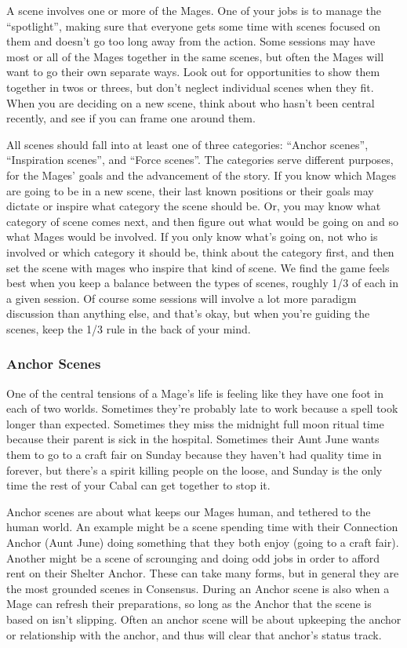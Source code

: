 \documentclass[
  oneside,
  statementpaper,
  9pt]{memoir}
\begin{document}
A scene involves one or more of the Mages. One of your jobs is to manage
the ``spotlight'', making sure that everyone gets some time with scenes
focused on them and doesn't go too long away from the action. Some
sessions may have most or all of the Mages together in the same scenes,
but often the Mages will want to go their own separate ways. Look out
for opportunities to show them together in twos or threes, but don't
neglect individual scenes when they fit. When you are deciding on a new
scene, think about who hasn't been central recently, and see if you can
frame one around them.

All scenes should fall into at least one of three categories: ``Anchor
scenes'', ``Inspiration scenes'', and ``Force scenes''. The categories
serve different purposes, for the Mages' goals and the advancement of
the story. If you know which Mages are going to be in a new scene, their
last known positions or their goals may dictate or inspire what category
the scene should be. Or, you may know what category of scene comes next,
and then figure out what would be going on and so what Mages would be
involved. If you only know what's going on, not who is involved or which
category it should be, think about the category first, and then set the
scene with mages who inspire that kind of scene. We find the game feels
best when you keep a balance between the types of scenes, roughly 1/3 of
each in a given session. Of course some sessions will involve a lot more
paradigm discussion than anything else, and that's okay, but when you're
guiding the scenes, keep the 1/3 rule in the back of your mind.

\hypertarget{anchor-scenes}{%
\subsubsection{Anchor Scenes}\label{anchor-scenes}}

One of the central tensions of a Mage's life is feeling like they have
one foot in each of two worlds. Sometimes they're probably late to work
because a spell took longer than expected. Sometimes they miss the
midnight full moon ritual time because their parent is sick in the
hospital. Sometimes their Aunt June wants them to go to a craft fair on
Sunday because they haven't had quality time in forever, but there's a
spirit killing people on the loose, and Sunday is the only time the rest
of your Cabal can get together to stop it.

Anchor scenes are about what keeps our Mages human, and tethered to the
human world. An example might be a scene spending time with their
Connection Anchor (Aunt June) doing something that they both enjoy
(going to a craft fair). Another might be a scene of scrounging and
doing odd jobs in order to afford rent on their Shelter Anchor. These
can take many forms, but in general they are the most grounded scenes in
Consensus. During an Anchor scene is also when a Mage can refresh their
preparations, so long as the Anchor that the scene is based on isn't
slipping. Often an anchor scene will be about upkeeping the anchor or
relationship with the anchor, and thus will clear that anchor's status
track.
\end{document}
